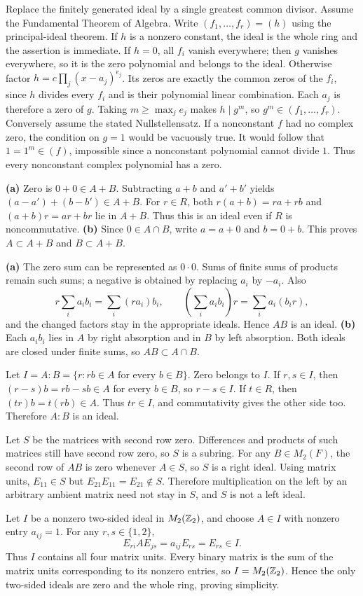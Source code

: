 \idea Replace the finitely generated ideal by a single greatest common divisor.
Assume the Fundamental Theorem of Algebra. Write $(f_1,\ldots,f_r)=(h)$ using the principal-ideal theorem. If $h$ is a nonzero constant, the ideal is the whole ring and the assertion is immediate. If $h=0$, all $f_i$ vanish everywhere; then $g$ vanishes everywhere, so it is the zero polynomial and belongs to the ideal.
Otherwise factor $h=c\prod_j(x-a_j)^{e_j}$. Its zeros are exactly the common zeros of the $f_i$, since $h$ divides every $f_i$ and is their polynomial linear combination. Each $a_j$ is therefore a zero of $g$. Taking $m\ge\max_j e_j$ makes $h\mid g^m$, so $g^m\in(f_1,\ldots,f_r)$.
Conversely assume the stated Nullstellensatz. If a nonconstant $f$ had no complex zero, the condition on $g=1$ would be vacuously true. It would follow that $1=1^m\in(f)$, impossible since a nonconstant polynomial cannot divide $1$. Thus every nonconstant complex polynomial has a zero.

\textbf{(a)} Zero is $0+0\in A+B$. Subtracting $a+b$ and $a'+b'$ yields $(a-a')+(b-b')\in A+B$. For $r\in R$, both $r(a+b)=ra+rb$ and $(a+b)r=ar+br$ lie in $A+B$. Thus this is an ideal even if $R$ is noncommutative.
\textbf{(b)} Since $0\in A\cap B$, write $a=a+0$ and $b=0+b$. This proves $A\subset A+B$ and $B\subset A+B$.

\textbf{(a)} The zero sum can be represented as $0\cdot0$. Sums of finite sums of products remain such sums; a negative is obtained by replacing $a_i$ by $-a_i$. Also
\[r\sum_i a_ib_i=\sum_i(ra_i)b_i,\qquad(\sum_i a_ib_i)r=\sum_i a_i(b_ir),\]
and the changed factors stay in the appropriate ideals. Hence $AB$ is an ideal.
\textbf{(b)} Each $a_ib_i$ lies in $A$ by right absorption and in $B$ by left absorption. Both ideals are closed under finite sums, so $AB\subset A\cap B$.

Let $I=A:B=\{r:rb\in A\text{ for every }b\in B\}$. Zero belongs to $I$. If $r,s\in I$, then $(r-s)b=rb-sb\in A$ for every $b\in B$, so $r-s\in I$. If $t\in R$, then $(tr)b=t(rb)\in A$. Thus $tr\in I$, and commutativity gives the other side too. Therefore $A:B$ is an ideal.

Let $S$ be the matrices with second row zero. Differences and products of such matrices still have second row zero, so $S$ is a subring. For any $B\in M_2(F)$, the second row of $AB$ is zero whenever $A\in S$, so $S$ is a right ideal.
Using matrix units, $E_{11}\in S$ but $E_{21}E_{11}=E_{21}\notin S$. Therefore multiplication on the left by an arbitrary ambient matrix need not stay in $S$, and $S$ is not a left ideal.

Let $I$ be a nonzero two-sided ideal in $M_2(\mathbb{Z}_2)$, and choose $A\in I$ with nonzero entry $a_{ij}=1$. For any $r,s\in\{1,2\}$,
\[E_{ri}AE_{js}=a_{ij}E_{rs}=E_{rs}\in I.\]
Thus $I$ contains all four matrix units. Every binary matrix is the sum of the matrix units corresponding to its nonzero entries, so $I=M_2(\mathbb{Z}_2)$. Hence the only two-sided ideals are zero and the whole ring, proving simplicity.
